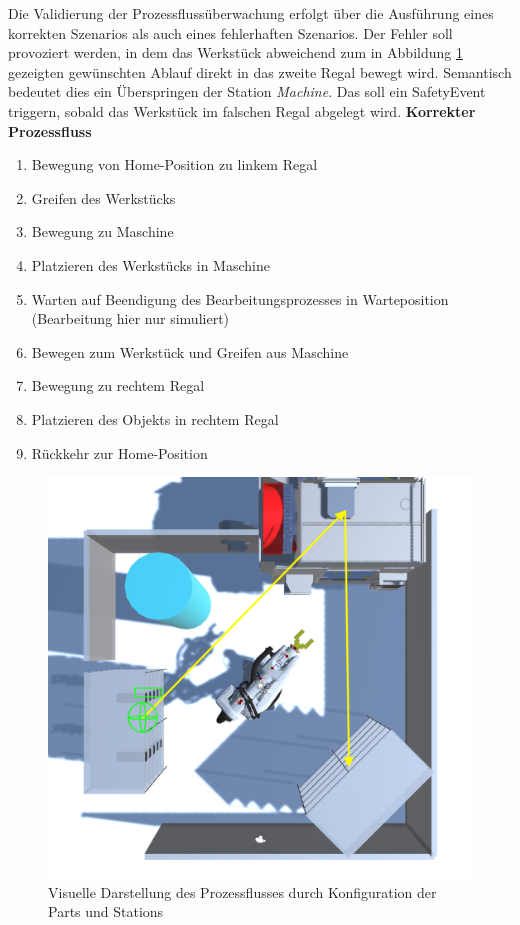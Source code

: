 Die Validierung der Prozessflussüberwachung erfolgt über die Ausführung eines
korrekten Szenarios als auch eines fehlerhaften Szenarios. Der Fehler soll
provoziert werden, in dem das Werkstück abweichend zum in Abbildung
\ref{figure:Prozessfluss} gezeigten gewünschten Ablauf direkt in das zweite
Regal bewegt wird. Semantisch bedeutet dies ein Überspringen der Station
\textit{Machine}. Das soll ein SafetyEvent triggern, sobald das Werkstück im
falschen Regal abgelegt wird.
\newpage
\textbf{Korrekter Prozessfluss}
\begin{enumerate}
  \item Bewegung von Home-Position zu linkem Regal
  \item Greifen des Werkstücks
  \item Bewegung zu Maschine
  \item Platzieren des Werkstücks in Maschine
  \item Warten auf Beendigung des Bearbeitungsprozesses in
    Warteposition (Bearbeitung hier nur simuliert)
  \item Bewegen zum Werkstück und Greifen aus Maschine
  \item Bewegung zu rechtem Regal
  \item Platzieren des Objekts in rechtem Regal
  \item Rückkehr zur Home-Position
\end{enumerate}

\begin{figure}[H]
  \centering
  \includegraphics[width=0.7\linewidth]{Figures/Prozessfolge.png}
  \caption{Visuelle Darstellung des Prozessflusses durch Konfiguration der Parts
  und Stations}
  \label{figure:Prozessfluss}
\end{figure}

